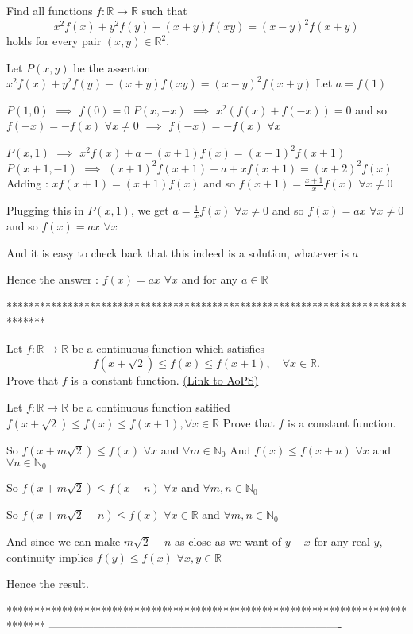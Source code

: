 \begin{solution}
	\begin{tcolorbox}Find all functions $f:\mathbb{R}\to\mathbb{R}$ such that \[x^2f(x)+y^2f(y)-(x+y)f(xy)=(x-y)^2f(x+y)\] holds for every pair $(x,y)\in\mathbb{R}^2$.\end{tcolorbox}
Let $P(x,y)$ be the assertion $x^2f(x)+y^2f(y)-(x+y)f(xy)=(x-y)^2f(x+y)$
Let $a=f(1)$

$P(1,0)$ $\implies$ $f(0)=0$
$P(x,-x)$ $\implies$ $x^2(f(x)+f(-x))=0$ and so $f(-x)=-f(x)$ $\forall x\ne 0$ $\implies$ $f(-x)=-f(x)$ $\forall x$


$P(x,1)$ $\implies$ $x^2f(x)+a-(x+1)f(x)=(x-1)^2f(x+1)$
$P(x+1,-1)$ $\implies$ $(x+1)^2f(x+1)-a+xf(x+1)=(x+2)^2f(x)$
Adding : $xf(x+1)=(x+1)f(x)$ and so $f(x+1)=\frac{x+1}xf(x)$ $\forall x\ne 0$

Plugging this in $P(x,1)$, we get $a=\frac 1xf(x)$ $\forall x\ne 0$ and so $f(x)=ax$ $\forall x\ne 0$ and so $f(x)=ax$ $\forall x$

And it is easy to check back that this indeed is a solution, whatever is $a$

Hence the answer : $\boxed{f(x)=ax}$ $\forall x$ and for any $a\in\mathbb R$
\end{solution}
*******************************************************************************
-------------------------------------------------------------------------------

\begin{problem}
	Let $f:\mathbb{R}\to\mathbb{R}$ be a continuous function which satisfies
\[f(x+\sqrt 2)\le f(x)\le f(x+1), \quad \forall x\in\mathbb{R}.\]
Prove that $f$ is a constant function.
	\flushright \href{https://artofproblemsolving.com/community/c6h435564}{(Link to AoPS)}
\end{problem}



\begin{solution}
	\begin{tcolorbox}Let $f:\mathbb{R}\to\mathbb{R}$ be a continuous function satified
$f(x+\sqrt 2)\le f(x)\le f(x+1),\forall x\in\mathbb{R}$
Prove that $f$ is a constant function.\end{tcolorbox}
So $f(x+m\sqrt 2)\le f(x)$ $\forall x$ and $\forall m\in\mathbb N_0$
And $f(x)\le f(x+n)$ $\forall x$ and $\forall n\in\mathbb N_0$

So $f(x+m\sqrt 2)\le f(x+n)$ $\forall x$ and $\forall m,n\in\mathbb N_0$

So $f(x+m\sqrt 2-n)\le f(x)$ $\forall x\in\mathbb R$ and $\forall m,n\in\mathbb N_0$

And since we can make $m\sqrt 2-n$ as close as we want of $y-x$ for any real $y$, continuity implies $f(y)\le f(x)$ $\forall x,y\in\mathbb R$

Hence the result.
\end{solution}
*******************************************************************************
-------------------------------------------------------------------------------

